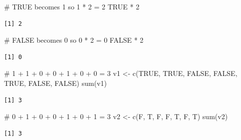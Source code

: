 \documentclass[
  letterpaper,
  DIV=11,
  numbers=noendperiod]{scrreprt}
\newenvironment{Shaded}{\begin{snugshade}}{\end{snugshade}}
\newcommand{\CommentTok}[1]{\textcolor[rgb]{0.37,0.37,0.37}{#1}}
\newcommand{\ConstantTok}[1]{\textcolor[rgb]{0.56,0.35,0.01}{#1}}
\newcommand{\DecValTok}[1]{\textcolor[rgb]{0.68,0.00,0.00}{#1}}
\newcommand{\FunctionTok}[1]{\textcolor[rgb]{0.28,0.35,0.67}{#1}}
\newcommand{\NormalTok}[1]{\textcolor[rgb]{0.00,0.23,0.31}{#1}}
\newcommand{\OtherTok}[1]{\textcolor[rgb]{0.00,0.23,0.31}{#1}}
\newcommand{\SpecialCharTok}[1]{\textcolor[rgb]{0.37,0.37,0.37}{#1}}
\begin{document}
\begin{tcolorbox}[enhanced jigsaw, colbacktitle=quarto-callout-tip-color!10!white, opacitybacktitle=0.6, breakable, left=2mm, leftrule=.75mm, toprule=.15mm, toptitle=1mm, bottomtitle=1mm, colframe=quarto-callout-tip-color-frame, opacityback=0, coltitle=black, arc=.35mm, titlerule=0mm, colback=white, bottomrule=.15mm, title=\textcolor{quarto-callout-tip-color}{\faLightbulb}\hspace{0.5em}{Answer}, rightrule=.15mm]

\begin{Shaded}
\begin{Highlighting}[]
\CommentTok{\# TRUE becomes 1 so 1 * 2 = 2}
\ConstantTok{TRUE} \SpecialCharTok{*} \DecValTok{2}
\end{Highlighting}
\end{Shaded}

\begin{verbatim}
[1] 2
\end{verbatim}

\begin{Shaded}
\begin{Highlighting}[]
\CommentTok{\# FALSE becomes 0 so 0 * 2 = 0}
\ConstantTok{FALSE} \SpecialCharTok{*} \DecValTok{2}
\end{Highlighting}
\end{Shaded}

\begin{verbatim}
[1] 0
\end{verbatim}

\begin{Shaded}
\begin{Highlighting}[]
\CommentTok{\# 1 + 1 + 0 + 0 + 1 + 0 + 0 = 3}
\NormalTok{v1 }\OtherTok{\textless{}{-}} \FunctionTok{c}\NormalTok{(}\ConstantTok{TRUE}\NormalTok{, }\ConstantTok{TRUE}\NormalTok{, }\ConstantTok{FALSE}\NormalTok{, }\ConstantTok{FALSE}\NormalTok{, }\ConstantTok{TRUE}\NormalTok{, }\ConstantTok{FALSE}\NormalTok{, }\ConstantTok{FALSE}\NormalTok{)}
\FunctionTok{sum}\NormalTok{(v1)}
\end{Highlighting}
\end{Shaded}

\begin{verbatim}
[1] 3
\end{verbatim}

\begin{Shaded}
\begin{Highlighting}[]
\CommentTok{\# 0 + 1 + 0 + 0 + 1 + 0 + 1 = 3}
\NormalTok{v2 }\OtherTok{\textless{}{-}} \FunctionTok{c}\NormalTok{(F, T, F, F, T, F, T)}
\FunctionTok{sum}\NormalTok{(v2)}
\end{Highlighting}
\end{Shaded}

\begin{verbatim}
[1] 3
\end{verbatim}

\end{tcolorbox}
\end{document}
